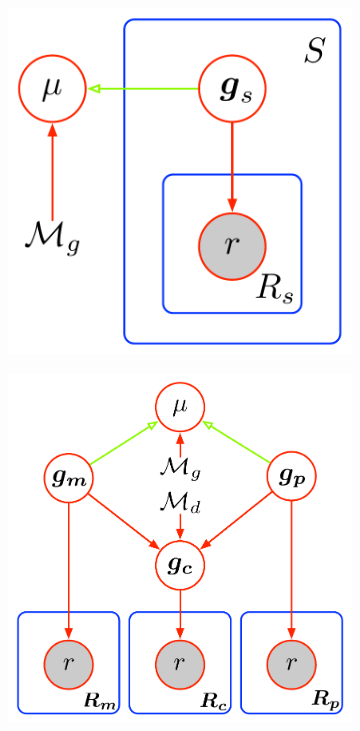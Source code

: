 \documentclass[notitlepage, twocolumn]{article}
\begin{document}
\begin{figure}[h]
    \centering
    \begin{subfigure}[b]{0.3\textwidth}
        \includegraphics[width=\textwidth]{figures/population_model}
        \caption{}
        \label{fig:pop}
    \end{subfigure}
    \hfill
    \begin{subfigure}[b]{0.3\textwidth}
        \includegraphics[width=\textwidth]{figures/trio_model}

\end{subfigure}
\end{figure}
\end{document}
